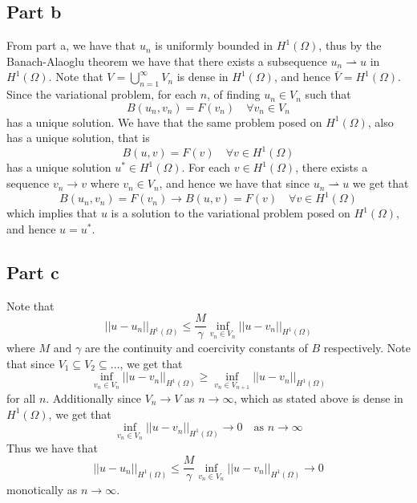 \documentclass[12pt]{report}
\newcommand{\norm}[1]{\left|\left|#1\right|\right|}
\begin{document}
\subsection*{Part b}
From part a, we have that $u_n$ is uniformly bounded in $H^1(\Omega)$, thus by the Banach-Alaoglu theorem we have that there exists a subsequence $u_n \rightharpoonup u$ in $H^1(\Omega)$.
Note that $V = \bigcup_{n=1}^\infty V_n$ is dense in $H^1(\Omega)$, and hence $\bar{V} = H^1(\Omega)$. Since the variational problem, for each $n$, of finding $u_n \in V_n$ such that 
\begin{equation*}
  B(u_n, v_n) = F(v_n) \quad \forall v_n \in V_n
\end{equation*}
has a unique solution. We have that the same problem posed on $H^1(\Omega)$, also has a unique solution, that is
\begin{equation*}
  B(u,v) = F(v) \quad \forall v \in H^1(\Omega)
\end{equation*}
has a unique solution $u^* \in H^1(\Omega)$. For each $v \in H^1(\Omega)$, there exists a sequence $v_n \to v$ where $v_n \in V_n$, and hence we have that since $u_n \rightharpoonup u$ we get that
\begin{equation*}
B(u_n, v_n) = F(v_n) \to B(u,v) = F(v) \quad \forall v \in H^1(\Omega)
\end{equation*}
which implies that $u$ is a solution to the variational problem posed on $H^1(\Omega)$, and hence $u = u^*$.

\subsection*{Part c}
Note that 
\begin{equation*}
  \norm{u - u_n}_{H^1(\Omega)} \leq \frac{M}{\gamma} \inf_{v_n \in V_n} \norm{u - v_n}_{H^1(\Omega)}
\end{equation*}
where $M$ and $\gamma$ are the continuity and coercivity constants of $B$ respectively. Note that since $V_1 \subseteq V_2 \subseteq \dots$, we get that
\begin{equation*}
  \inf_{v_n \in V_n} \norm{u - v_n}_{H^1(\Omega)} \geq \inf_{v_n \in V_{n+1}} \norm{u-v_n}_{H^1(\Omega)}
\end{equation*}
for all $n$. Additionally since $V_n \to V$ as $n \to \infty$, which as stated above is dense in $H^1(\Omega)$, we get that
\begin{equation*}
  \inf_{v_n \in V_n} \norm{u - v_n}_{H^1(\Omega)} \to 0 \quad \text{as } n \to \infty
\end{equation*}
Thus we have that
\begin{equation*}
  \norm{u - u_n}_{H^1(\Omega)} \leq \frac{M}{\gamma} \inf_{v_n \in V_n} \norm{u - v_n}_{H^1(\Omega)} \to 0
\end{equation*}
monotically as $n \to \infty$.
\end{document}
